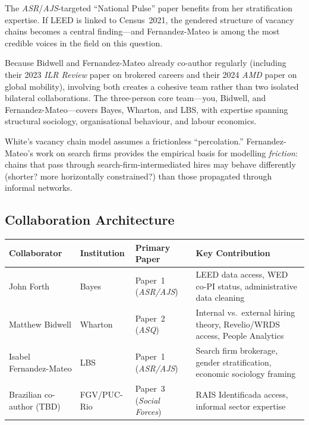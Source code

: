\documentclass[a4paper]{tufte-handout}
\begin{document}
\begin{description}[style=nextline, font=\normalfont\itshape]
  \item[Paper~1 co-author]
    The \emph{ASR}/\emph{AJS}-targeted ``National Pulse'' paper benefits from her stratification expertise. If LEED is linked to Census~2021, the gendered structure of vacancy chains becomes a central finding---and Fernandez-Mateo is among the most credible voices in the field on this question.
  \item[The Bidwell--Fernandez-Mateo axis]
    Because Bidwell and Fernandez-Mateo already co-author regularly (including their 2023 \emph{ILR Review} paper on brokered careers and their 2024 \emph{AMD} paper on global mobility), involving both creates a cohesive team rather than two isolated bilateral collaborations. The three-person core team---you, Bidwell, and Fernandez-Mateo---covers Bayes, Wharton, and LBS, with expertise spanning structural sociology, organisational behaviour, and labour economics.
  \item[Brokerage theory integration]
    White's vacancy chain model assumes a frictionless ``percolation.'' Fernandez-Mateo's work on search firms provides the empirical basis for modelling \emph{friction}: chains that pass through search-firm-intermediated hires may behave differently (shorter? more horizontally constrained?) than those propagated through informal networks.
\end{description}


\subsection{Collaboration Architecture}

\begin{fullwidth}
\smallskip
\small
\begin{tabularx}{\linewidth}{@{}l l l X@{}}
  \toprule
  \textbf{Collaborator} & \textbf{Institution} & \textbf{Primary Paper} & \textbf{Key Contribution} \\
  \midrule
  John Forth       & Bayes      & Paper~1 (\emph{ASR/AJS})  & LEED data access, WED co-PI status, administrative data cleaning \\[4pt]
  Matthew Bidwell  & Wharton    & Paper~2 (\emph{ASQ})      & Internal vs.\ external hiring theory, Revelio/WRDS access, People Analytics \\[4pt]
  Isabel Fernandez-Mateo & LBS  & Paper~1 (\emph{ASR/AJS})  & Search firm brokerage, gender stratification, economic sociology framing \\[4pt]
  Brazilian co-author (TBD) & FGV/PUC-Rio & Paper~3 (\emph{Social Forces}) & RAIS Identificada access, informal sector expertise \\
  \bottomrule
\end{tabularx}
\smallskip
\end{fullwidth}
\end{document}
